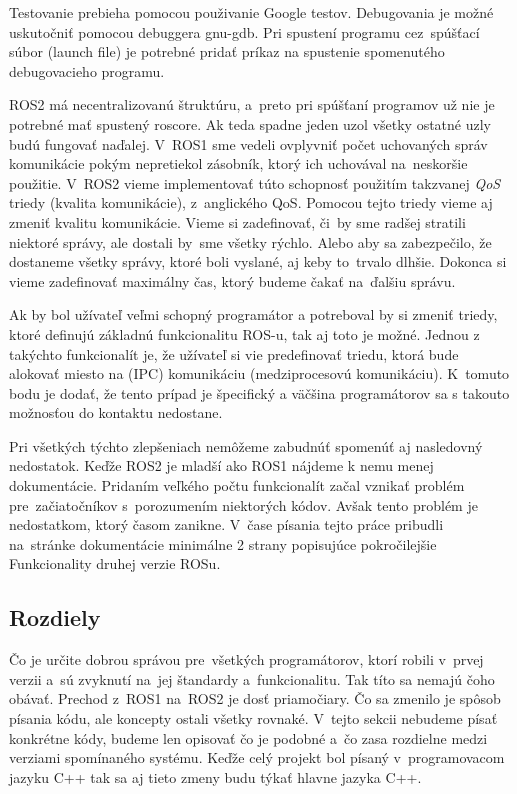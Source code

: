 Testovanie prebieha pomocou použivanie Google testov. Debugovania je možné uskutočniť pomocou debuggera gnu-gdb. Pri spustení programu
cez~spúšťací súbor (launch file) je potrebné pridať príkaz na spustenie spomenutého debugovacieho programu.

ROS2 má necentralizovanú štruktúru, a~preto pri spúšťaní programov už nie je potrebné mať spustený roscore. Ak teda spadne jeden uzol všetky
ostatné uzly budú fungovať naďalej. V~ROS1 sme vedeli ovplyvniť počet uchovaných správ komunikácie pokým nepretiekol zásobník, ktorý ich uchovával
na~neskoršie použitie. V~ROS2 vieme implementovať túto schopnosť použitím takzvanej \textit{QoS} triedy (kvalita komunikácie), z~anglického \acrlong{QoS}.
Pomocou tejto triedy vieme aj zmeniť kvalitu komunikácie. Vieme si zadefinovať, či~by sme radšej stratili niektoré správy, ale dostali by~sme
všetky rýchlo. Alebo aby sa zabezpečilo, že dostaneme všetky správy, ktoré boli vyslané, aj keby to~trvalo dlhšie. Dokonca si vieme zadefinovať
maximálny čas, ktorý budeme čakať na~ďalšiu správu.

Ak by bol užívateľ veľmi schopný programátor a potreboval by si zmeniť triedy, ktoré definujú základnú funkcionalitu ROS-u, tak aj toto je možné.
Jednou z takýchto funkcionalít je, že užívateľ si vie predefinovať triedu, ktorá bude alokovať miesto na (IPC) komunikáciu (medziprocesovú komunikáciu).
K~tomuto bodu je dodať, že tento prípad je špecifický a väčšina programátorov sa s takouto možnosťou do kontaktu nedostane.

Pri všetkých týchto zlepšeniach nemôžeme zabudnúť spomenúť aj nasledovný nedostatok. Keďže ROS2 je mladší ako ROS1 nájdeme k nemu menej dokumentácie.
Pridaním veľkého počtu funkcionalít začal vznikať problém pre~začiatočníkov s~porozumením niektorých kódov. Avšak tento problém je nedostatkom,
ktorý časom zanikne. V~čase písania tejto práce pribudli na~stránke dokumentácie minimálne 2 strany popisujúce pokročilejšie Funkcionality druhej
verzie ROSu.

\subsection{Rozdiely}

Čo je určite dobrou správou pre~všetkých programátorov, ktorí robili v~prvej verzii a~sú zvyknutí na~jej štandardy a~funkcionalitu. Tak títo
sa nemajú čoho obávať. Prechod z~ROS1 na~ROS2 je dosť priamočiary. Čo sa zmenilo je spôsob písania kódu, ale koncepty ostali všetky rovnaké.
V~tejto sekcii nebudeme písať konkrétne kódy, budeme len opisovať čo je podobné a~čo zasa rozdielne medzi verziami spomínaného systému. Keďže
celý projekt bol písaný v~programovacom jazyku C++ tak sa aj tieto zmeny budu týkať hlavne jazyka C++.

